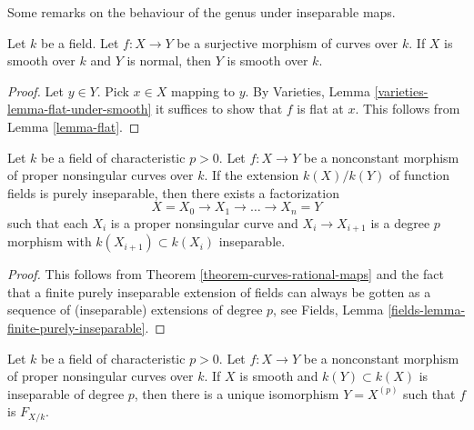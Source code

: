 \noindent
Some remarks on the behaviour of the genus under inseparable maps.

\begin{lemma}
\label{lemma-dominated-by-smooth}
Let $k$ be a field. Let $f : X \to Y$ be a surjective morphism
of curves over $k$. If $X$ is smooth over $k$ and
$Y$ is normal, then $Y$ is smooth over $k$.
\end{lemma}

\begin{proof}
Let $y \in Y$. Pick $x \in X$ mapping to $y$.
By Varieties, Lemma \ref{varieties-lemma-flat-under-smooth}
it suffices to show that $f$ is flat at $x$.
This follows from Lemma \ref{lemma-flat}.
\end{proof}

\begin{lemma}
\label{lemma-purely-inseparable}
Let $k$ be a field of characteristic $p > 0$. Let $f : X \to Y$ be a
nonconstant morphism of proper nonsingular curves over $k$.
If the extension $k(X)/k(Y)$ of function fields
is purely inseparable, then there exists a factorization
$$
X = X_0 \to X_1 \to \ldots \to X_n = Y
$$
such that each $X_i$ is a proper nonsingular curve
and $X_i \to X_{i + 1}$ is a degree $p$
morphism with $k(X_{i + 1}) \subset k(X_i)$
inseparable.
\end{lemma}

\begin{proof}
This follows from Theorem \ref{theorem-curves-rational-maps}
and the fact that a finite purely inseparable extension of fields
can always be gotten as a sequence of (inseparable) extensions of degree $p$,
see Fields, Lemma \ref{fields-lemma-finite-purely-inseparable}.
\end{proof}

\begin{lemma}
\label{lemma-inseparable-deg-p-smooth}
Let $k$ be a field of characteristic $p > 0$. Let $f : X \to Y$ be a
nonconstant morphism of proper nonsingular curves over $k$.
If $X$ is smooth and $k(Y) \subset k(X)$ is inseparable of degree $p$,
then there is a unique isomorphism $Y = X^{(p)}$ such that
$f$ is $F_{X/k}$.
\end{lemma}

